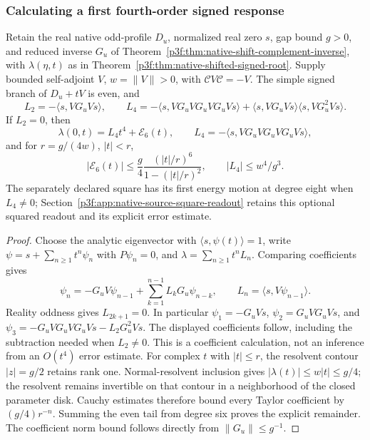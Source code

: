 \documentclass[11pt,a4paper]{article}
\begin{document}
\subsubsection{Calculating a first fourth-order signed response}
\label{p3f:sec:native-quartic-response}

\begin{theorem}
\label{p3f:thm:native-first-quartic-response}
Retain the real native odd-profile \(D_u\), normalized real zero \(s\),
gap bound \(g>0\), and reduced inverse \(G_u\) of
Theorem~\ref{p3f:thm:native-shift-complement-inverse}, with
\(\lambda(\eta,t)\) as in Theorem~\ref{p3f:thm:native-shifted-signed-root}. Supply bounded
self-adjoint \(V\), \(w=\lVert V\rVert>0\), with
\(\mathcal CV\mathcal C=-V\). The simple signed branch of \(D_u+tV\)
is even, and
\[
 L_2=-\langle s,VG_uVs\rangle,\qquad
 L_4=-\langle s,VG_uVG_uVG_uVs\rangle
       +\langle s,VG_uVs\rangle\langle s,VG_u^2Vs\rangle.
\]
If \(L_2=0\), then
\begin{equation}
 \lambda(0,t)=L_4t^4+\mathcal E_6(t),\qquad
 L_4=-\langle s,VG_uVG_uVG_uVs\rangle,
 \label{p3f:eq:native-first-quartic-coefficient}
\end{equation}
and for \(r=g/(4w)\), \(|t|<r\),
\begin{equation}
 |\mathcal E_6(t)|\le\frac g4
 \frac{(|t|/r)^6}{1-(|t|/r)^2},\qquad |L_4|\le w^4/g^3.
 \label{p3f:eq:native-quartic-sixth-remainder}
\end{equation}
The separately declared square has its first energy motion at degree
eight when \(L_4\ne0\); Section~\ref{p3f:app:native-source-square-readout}
retains this optional squared readout and its explicit error estimate.
\end{theorem}
\begin{proof}
Choose the analytic eigenvector with \(\langle s,\psi(t)\rangle=1\),
write \(\psi=s+\sum_{n\ge1}t^n\psi_n\) with \(P\psi_n=0\), and
\(\lambda=\sum_{n\ge1}t^nL_n\). Comparing coefficients gives
\[
 \psi_n=-G_uV\psi_{n-1}
       +\sum_{k=1}^{n-1}L_kG_u\psi_{n-k},\qquad
 L_n=\langle s,V\psi_{n-1}\rangle.
\]
Reality oddness gives \(L_{2k+1}=0\). In particular
\(\psi_1=-G_uVs\), \(\psi_2=G_uVG_uVs\), and
\(\psi_3=-G_uVG_uVG_uVs-L_2G_u^2Vs\).
The displayed coefficients follow, including the subtraction needed
when \(L_2\ne0\). This is a coefficient calculation, not an inference
from an \(O(t^4)\) error estimate.
For complex \(t\) with \(|t|\le r\), the resolvent contour
\(|z|=g/2\) retains rank one. Normal-resolvent inclusion gives
\(|\lambda(t)|\le w|t|\le g/4\); the resolvent remains invertible on
that contour in a neighborhood of the closed parameter disk.
Cauchy estimates therefore bound every Taylor coefficient by
\((g/4)r^{-n}\). Summing the even tail from degree six proves the
explicit remainder. The coefficient norm bound follows directly from
\(\lVert G_u\rVert\le g^{-1}\).
\end{proof}
\end{document}
